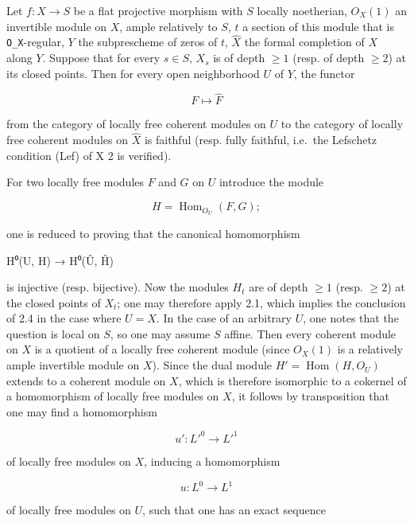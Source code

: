\documentclass[
]{article}
\newenvironment{Shaded}{}{}
\newcommand{\NormalTok}[1]{#1}
\begin{document}
Let \(f: X \to S\) be a flat projective morphism with \(S\) locally
noetherian, \(O_{X}(1)\) an invertible module on \(X\), ample relatively
to \(S\), \(t\) a section of this module that is \texttt{O\_X}-regular,
\(Y\) the subprescheme of zeros of \(t\), \(\hat{X}\) the formal
completion of \(X\) along \(Y\). Suppose that for every \(s \in S\),
\(X_{s}\) is of depth \(\geqslant 1\) (resp. of depth \(\geqslant 2\))
at its closed points. Then for every open neighborhood \(U\) of \(Y\),
the functor

\[
F \mapsto \hat{F}
\]

from the category of locally free coherent modules on \(U\) to the
category of locally free coherent modules on \(\hat{X}\) is faithful
(resp. fully faithful, i.e.~the Lefschetz condition (Lef) of X 2 is
verified).

For two locally free modules \(F\) and \(G\) on \(U\) introduce the
module

\[
H = \operatorname{Hom}_{O_{U}}(F, G);
\]

one is reduced to proving that the canonical homomorphism

\begin{Shaded}
\begin{Highlighting}[]
\NormalTok{H⁰(U, H) → H⁰(Û, Ĥ)}
\end{Highlighting}
\end{Shaded}

is injective (resp. bijective). Now the modules \(H_{t}\) are of depth
\(\geqslant 1\) (resp. \(\geqslant 2\)) at the closed points of
\(X_{t}\); one may therefore apply 2.1, which implies the conclusion of
2.4 in the case where \(U = X\). In the case of an arbitrary \(U\), one
notes that the question is local on \(S\), so one may assume \(S\)
affine. Then every coherent module on \(X\) is a quotient of a locally
free coherent module (since \(O_{X}(1)\) is a relatively ample
invertible module on \(X\)). Since the dual module
\(H' = \operatorname{Hom}(H, O_{U})\) extends to a coherent module on
\(X\), which is therefore isomorphic to a cokernel of a homomorphism of
locally free modules on \(X\), it follows by transposition that one may
find a homomorphism

\[
u': L'^{0} \to L'^{1}
\]

of locally free modules on \(X\), inducing a homomorphism

\[
u: L^{0} \to L^{1}
\]

of locally free modules on \(U\), such that one has an exact sequence
\end{document}
